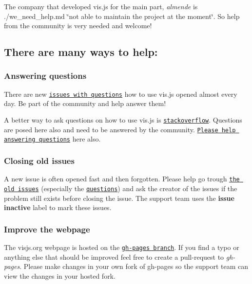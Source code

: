 The company that developed vis.\+js for the main part, {\itshape almende} is ./we\+\_\+need\+\_\+help.md \char`\"{}not able to maintain the project at the moment\char`\"{}. So help from the community is very needed and welcome!

\subsection*{There are many ways to help\+:}

\subsubsection*{Answering questions}

There are new \href{//github.com/almende/vis/issues?q=is%3Aissue+is%3Aopen+label%3AQuestion+sort%3Acreated-desc}{\tt issues with questions} how to use vis.\+js opened almost every day. Be part of the community and help answer them!

A better way to ask questions on how to use vis.\+js is \href{https://stackoverflow.com/tags/vis.js}{\tt stackoverflow}. Questions are posed here also and need to be answered by the community. \href{https://stackoverflow.com/tags/vis.js}{\tt Please help answering questions} here also.

\subsubsection*{Closing old issues}

A new issue is often opened fast and then forgotten. Please help go trough \href{//github.com/almende/vis/issues?q=is%3Aissue+is%3Aopen+sort%3Acreated-asc}{\tt the old issues} (especially the \href{//github.com/almende/vis/issues?q=is%3Aissue+is%3Aopen+sort%3Acreated-asc+label%3AQuestion}{\tt questions}) and ask the creator of the issues if the problem still exists before closing the issue. The support team uses the {\bfseries issue inactive} label to mark these issues.

\subsubsection*{Improve the webpage}

The visjs.\+org webpage is hosted on the \href{//github.com/almende/vis/tree/gh-pages}{\tt gh-\/pages branch}. If you find a typo or anything else that should be improved feel free to create a pull-\/request to {\itshape gh-\/pages}. Please make changes in your own fork of gh-\/pages so the support team can view the changes in your hosted fork.

